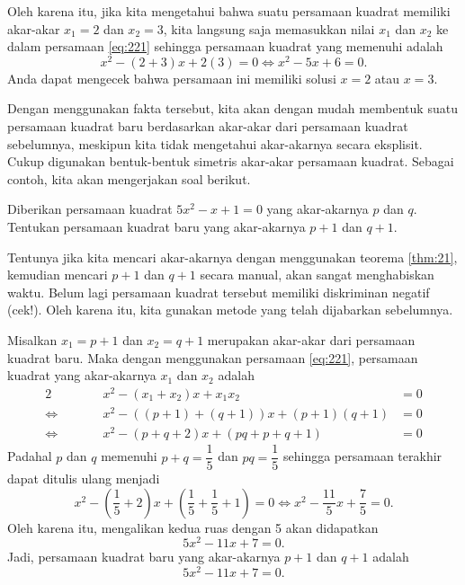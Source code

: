 	\par Oleh karena itu, jika kita mengetahui bahwa suatu persamaan kuadrat memiliki akar-akar $ x_{1} = 2 $ dan $ x_{2} = 3 $, kita langsung saja memasukkan nilai $ x_{1} $ dan $ x_{2} $ ke dalam persamaan \ref{eq:221} sehingga persamaan kuadrat yang memenuhi adalah
	\[ x^{2} - \left(2 + 3\right)x + 2\left(3\right) = 0 \iff x^{2} - 5x + 6 = 0. \]
	Anda dapat mengecek bahwa persamaan ini memiliki solusi $ x = 2 $ atau $ x = 3 $.
	
	\par Dengan menggunakan fakta tersebut, kita akan dengan mudah membentuk suatu persamaan kuadrat baru berdasarkan akar-akar dari persamaan kuadrat sebelumnya, meskipun kita tidak mengetahui akar-akarnya secara eksplisit. Cukup digunakan bentuk-bentuk simetris akar-akar persamaan kuadrat. Sebagai contoh, kita akan mengerjakan soal berikut.
	
	\begin{contoh}
		Diberikan persamaan kuadrat $ 5x^{2} - x + 1 = 0 $ yang akar-akarnya $ p $ dan $ q $. Tentukan persamaan kuadrat baru yang akar-akarnya $ p + 1 $ dan $ q + 1 $.
	\end{contoh}
	\begin{jawab}
		Tentunya jika kita mencari akar-akarnya dengan menggunakan teorema \ref{thm:21}, kemudian mencari $ p + 1 $ dan $ q + 1 $ secara manual, akan sangat menghabiskan waktu. Belum lagi persamaan kuadrat tersebut memiliki diskriminan negatif (cek!). Oleh karena itu, kita gunakan metode yang telah dijabarkan sebelumnya.
		\par Misalkan $ x_{1} = p + 1 $ dan $ x_{2} = q + 1 $ merupakan akar-akar dari persamaan kuadrat baru. Maka dengan menggunakan persamaan \ref{eq:221}, persamaan kuadrat yang akar-akarnya $ x_{1} $ dan $ x_{2} $ adalah
		\begin{alignat*}{2}
			&\qquad& x^{2} - \left(x_{1} + x_{2}\right)x + x_{1}x_{2} &= 0 \\
			\iff&& x^{2} - \left(\left(p + 1\right) + \left(q + 1\right)\right)x + \left(p + 1\right)\left(q + 1\right) &= 0 \\
			\iff&& x^{2} - \left(p + q + 2\right)x + \left(pq + p + q + 1\right) &= 0
		\end{alignat*}
		Padahal $ p $ dan $ q $ memenuhi $ p + q = \dfrac{1}{5} $ dan $ pq = \dfrac{1}{5} $ sehingga persamaan terakhir dapat ditulis ulang menjadi
		\[ x^{2} - \left(\frac{1}{5} + 2\right)x + \left(\frac{1}{5} + \frac{1}{5} + 1\right) = 0 \iff x^{2} - \frac{11}{5}x + \frac{7}{5} = 0. \]
		Oleh karena itu, mengalikan kedua ruas dengan 5 akan didapatkan
		\[ 5x^{2} - 11x + 7 = 0. \]
		Jadi, persamaan kuadrat baru yang akar-akarnya $ p + 1 $ dan $ q + 1 $ adalah
		\[ 5x^{2} - 11x + 7 = 0. \]
	\end{jawab}
	
